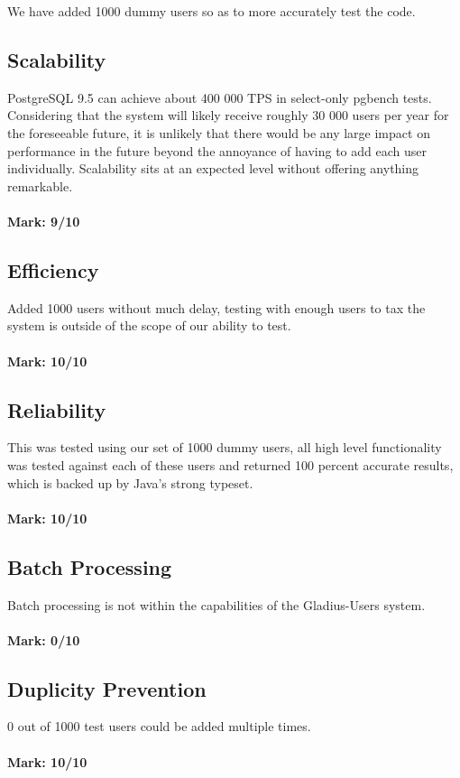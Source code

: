 \documentclass[12pt]{article}
\begin{document}
	We have added 1000 dummy users so as to more accurately test the code.

	\subsection{Scalability}
	PostgreSQL 9.5 can achieve about 400 000 TPS in select-only pgbench tests. Considering that the system will likely receive roughly 30 000 users per year for the foreseeable 		future, it is unlikely that there would be any large impact on performance in the future beyond the annoyance of having to add each user individually. Scalability sits at an 			expected level without offering anything remarkable. \\ \\
	\textbf{Mark: 9/10}
	
	\subsection{Efficiency} 
	Added 1000 users without much delay, testing with enough users to tax the system is outside of the scope of our ability to test. \\ \\ 
	\textbf{Mark: 10/10}
	
	\subsection{Reliability} 
	This was tested using our set of 1000 dummy users, all high level functionality was tested against each of these users and returned 100 percent accurate results, which is backed up by Java's strong typeset. \\ \\ 
	\textbf{Mark: 10/10} 
	
	\subsection{Batch Processing}
	Batch processing is not within the capabilities of the Gladius-Users system.\\ \\ 
	\textbf{Mark: 0/10}
	
	\subsection{Duplicity Prevention}
	0 out of 1000 test users could be added multiple times. \\ \\ 
	\textbf{Mark: 10/10}
	
\end{document}
